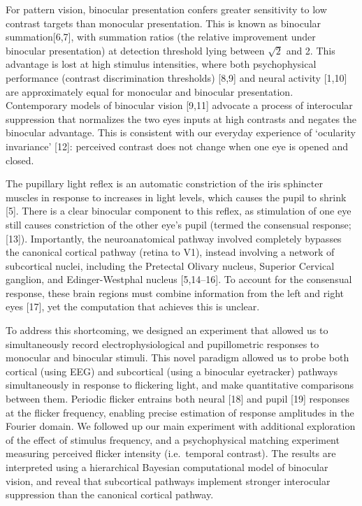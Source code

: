 \documentclass[
]{article}
\begin{document}
For pattern vision, binocular presentation confers greater sensitivity to low contrast targets than monocular presentation. This is known as binocular summation{[}6,7{]}, with summation ratios (the relative improvement under binocular presentation) at detection threshold lying between \(\sqrt{2}\) and 2. This advantage is lost at high stimulus intensities, where both psychophysical performance (contrast discrimination thresholds) {[}8,9{]} and neural activity {[}1,10{]} are approximately equal for monocular and binocular presentation. Contemporary models of binocular vision {[}9,11{]} advocate a process of interocular suppression that normalizes the two eyes inputs at high contrasts and negates the binocular advantage. This is consistent with our everyday experience of `ocularity invariance' {[}12{]}: perceived contrast does not change when one eye is opened and closed.

The pupillary light reflex is an automatic constriction of the iris sphincter muscles in response to increases in light levels, which causes the pupil to shrink {[}5{]}. There is a clear binocular component to this reflex, as stimulation of one eye still causes constriction of the other eye's pupil (termed the consensual response; {[}13{]}). Importantly, the neuroanatomical pathway involved completely bypasses the canonical cortical pathway (retina to V1), instead involving a network of subcortical nuclei, including the Pretectal Olivary nucleus, Superior Cervical ganglion, and Edinger-Westphal nucleus {[}5,14--16{]}. To account for the consensual response, these brain regions must combine information from the left and right eyes {[}17{]}, yet the computation that achieves this is unclear.

To address this shortcoming, we designed an experiment that allowed us to simultaneously record electrophysiological and pupillometric responses to monocular and binocular stimuli. This novel paradigm allowed us to probe both cortical (using EEG) and subcortical (using a binocular eyetracker) pathways simultaneously in response to flickering light, and make quantitative comparisons between them. Periodic flicker entrains both neural {[}18{]} and pupil {[}19{]} responses at the flicker frequency, enabling precise estimation of response amplitudes in the Fourier domain. We followed up our main experiment with additional exploration of the effect of stimulus frequency, and a psychophysical matching experiment measuring perceived flicker intensity (i.e.~temporal contrast). The results are interpreted using a hierarchical Bayesian computational model of binocular vision, and reveal that subcortical pathways implement stronger interocular suppression than the canonical cortical pathway.
\end{document}
